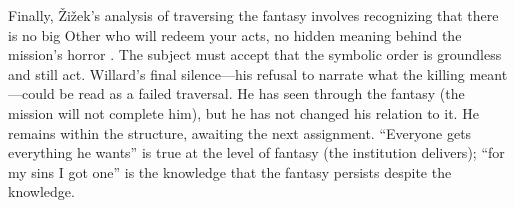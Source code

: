 Finally, {\v{Z}}i{\v{z}}ek's analysis of traversing the fantasy involves recognizing that
there is no big Other who will redeem your acts, no hidden meaning behind the mission's horror
\parencite{ZizekSublime1999}. The subject must accept that the symbolic order is groundless
and still act. Willard's final silence---his refusal to narrate what the killing meant---could
be read as a failed traversal. He has seen through the fantasy (the mission will not complete
him), but he has not changed his relation to it. He remains within the structure, awaiting the
next assignment. ``Everyone gets everything he wants'' is true at the level of fantasy (the
institution delivers); ``for my sins I got one'' is the knowledge that the fantasy persists
despite the knowledge.
